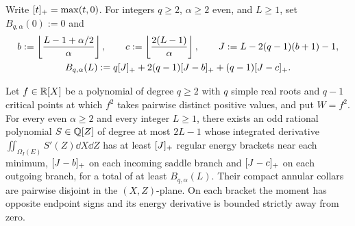 Write $[t]_+=\max(t,0)$. For integers $q\ge 2$, $\alpha\ge 2$ even, and $L\ge 1$, set $B_{q,\alpha}(0):=0$ and
\begin{equation}\label{eq:Bqalpha}
  \begin{gathered}
    b := \left\lfloor\frac{L-1+\alpha/2}{\alpha}\right\rfloor, \qquad
    c := \left\lfloor\frac{2(L-1)}{\alpha}\right\rfloor, \qquad
    J := L - 2(q-1)(b+1) - 1, \\
    B_{q,\alpha}(L) := q[J]_+ + 2(q-1)[J-b]_+ + (q-1)[J-c]_+.
  \end{gathered}
\end{equation}

\begin{lemma}\label{lem:endpoint-cluster}
Let $f\in\mathbb{R}[X]$ be a polynomial of degree $q\ge 2$ with $q$ simple real roots and $q-1$ critical points at which $f^2$ takes pairwise distinct positive values, and put $W=f^2$. For every even $\alpha\ge 2$ and every integer $L\ge 1$, there exists an odd rational polynomial $S\in\mathbb{Q}[Z]$ of degree at most $2L-1$ whose integrated derivative $\iint_{\Omega_I(E)} S'(Z)\dd X\dd Z$ has at least $[J]_+$ regular energy brackets near each minimum, $[J-b]_+$ on each incoming saddle branch and $[J-c]_+$ on each outgoing branch, for a total of at least $B_{q,\alpha}(L)$. Their compact annular collars are pairwise disjoint in the $(X,Z)$-plane. On each bracket the moment has opposite endpoint signs and its energy derivative is bounded strictly away from zero.
\end{lemma}

